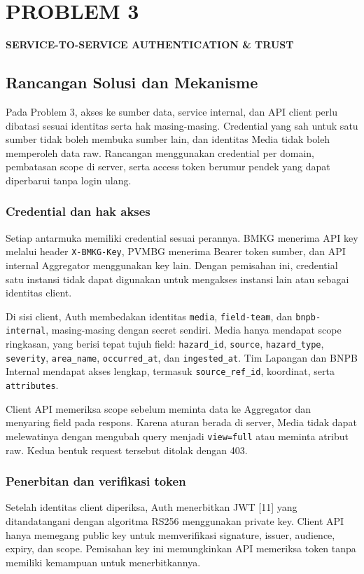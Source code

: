 \chapter{PROBLEM 3}
\begin{center}\large\bfseries SERVICE-TO-SERVICE AUTHENTICATION \& TRUST\end{center}

\section{Rancangan Solusi dan Mekanisme}
Pada Problem 3, akses ke sumber data, service internal, dan API client perlu dibatasi sesuai identitas serta hak masing-masing. Credential yang sah untuk satu sumber tidak boleh membuka sumber lain, dan identitas Media tidak boleh memperoleh data raw. Rancangan menggunakan credential per domain, pembatasan scope di server, serta access token berumur pendek yang dapat diperbarui tanpa login ulang.

\subsection{Credential dan hak akses}
Setiap antarmuka memiliki credential sesuai perannya. BMKG menerima API key melalui header \texttt{X-BMKG-Key}, PVMBG menerima Bearer token sumber, dan API internal Aggregator menggunakan key lain. Dengan pemisahan ini, credential satu instansi tidak dapat digunakan untuk mengakses instansi lain atau sebagai identitas client.

Di sisi client, Auth membedakan identitas \texttt{media}, \texttt{field-team}, dan \texttt{bnpb-internal}, masing-masing dengan secret sendiri. Media hanya mendapat scope ringkasan, yang berisi tepat tujuh field: \texttt{hazard\_id}, \texttt{source}, \texttt{hazard\_type}, \texttt{severity}, \texttt{area\_name}, \texttt{occurred\_at}, dan \texttt{ingested\_at}. Tim Lapangan dan BNPB Internal mendapat akses lengkap, termasuk \texttt{source\_ref\_id}, koordinat, serta \texttt{attributes}.

Client API memeriksa scope sebelum meminta data ke Aggregator dan menyaring field pada respons. Karena aturan berada di server, Media tidak dapat melewatinya dengan mengubah query menjadi \texttt{view=full} atau meminta atribut raw. Kedua bentuk request tersebut ditolak dengan 403.

\subsection{Penerbitan dan verifikasi token}
Setelah identitas client diperiksa, Auth menerbitkan JWT [11] yang ditandatangani dengan algoritma RS256 menggunakan private key. Client API hanya memegang public key untuk memverifikasi signature, issuer, audience, expiry, dan scope. Pemisahan key ini memungkinkan API memeriksa token tanpa memiliki kemampuan untuk menerbitkannya.

